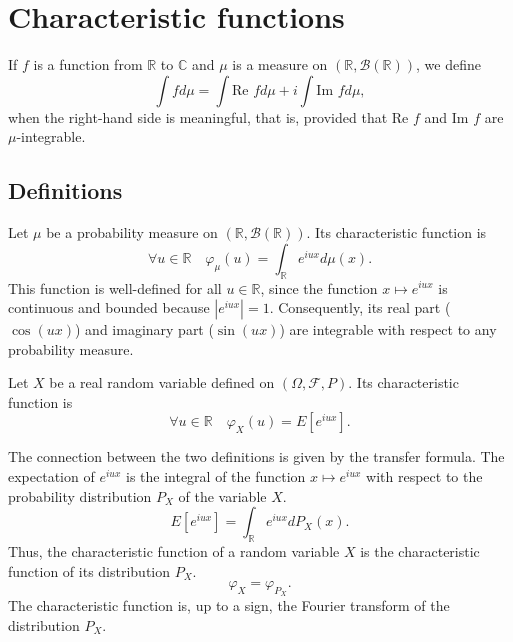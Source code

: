\chapter{Characteristic functions}%
\sloppy

If $f$ is a function from $\mathbb{R}$ to $\mathbb{C}$ and $\mu$ is a measure on $(\mathbb{R}, \mathcal{B}(\mathbb{R}))$, we define
\[ \int f d\mu = \int \text{Re } f d\mu + i \int \text{Im } f d\mu, \]
when the right-hand side is meaningful, that is, provided that $\text{Re } f$ and $\text{Im } f$ are $\mu$-integrable.%
\section{Definitions}%
\begin{definition}
Let $\mu$ be a probability measure on $(\mathbb{R}, \mathcal{B}(\mathbb{R}))$. Its characteristic function is
\[ \forall u \in \mathbb{R} \quad \varphi_{\mu}(u) = \int_{\mathbb{R}} e^{iux} d\mu(x). \]
This function is well-defined for all $u \in \mathbb{R}$, since the function $x \mapsto e^{iux}$ is continuous and bounded because $|e^{iux}| = 1$. Consequently, its real part ($\cos(ux)$) and imaginary part ($\sin(ux)$) are integrable with respect to any probability measure.
\end{definition}%
\begin{definition}
Let $X$ be a real random variable defined on $(\Omega, \mathcal{F}, P)$. Its characteristic function is
\[ \forall u \in \mathbb{R} \quad \varphi_X(u) = E[e^{iux}]. \]
\end{definition}%
The connection between the two definitions is given by the transfer formula. The expectation of $e^{iux}$ is the integral of the function $x \mapsto e^{iux}$ with respect to the probability distribution $P_X$ of the variable $X$.
\[ E[e^{iux}] = \int_{\mathbb{R}} e^{iux} dP_X(x). \]
Thus, the characteristic function of a random variable $X$ is the characteristic function of its distribution $P_X$.
\[ \varphi_X = \varphi_{P_X}. \]
The characteristic function is, up to a sign, the Fourier transform of the distribution $P_X$.%
